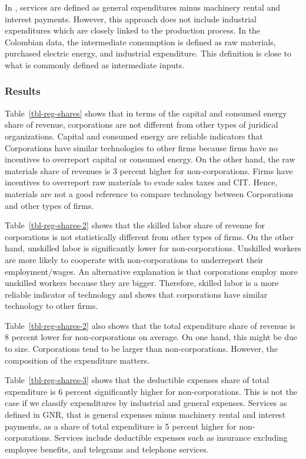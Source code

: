 \documentclass[
  12pt]{article}
\theoremstyle{definition}
\theoremstyle{remark}
\begin{document}
In \citet{Gandhi2020}, services are defined as general expenditures
minus machinery rental and interest payments. However, this approach
does not include industrial expenditures which are closely linked to the
production process. In the Colombian data, the intermediate consumption
is defined as raw materials, purchased electric energy, and industrial
expenditure. This definition is close to what is commonly defined as
intermediate inputs.

\subsubsection{Results}\label{results}

Table~\ref{tbl-reg-shares} shows that in terms of the capital and
consumed energy share of revenue, corporations are not different from
other types of juridical organizations. Capital and consumed energy are
reliable indicators that Corporations have similar technologies to other
firms because firms have no incentives to overreport capital or consumed
energy. On the other hand, the raw materials share of revenues is 3
percent higher for non-corporations. Firms have incentives to overreport
raw materials to evade sales taxes and CIT. Hence, materials are not a
good reference to compare technology between Corporations and other
types of firms.

Table~\ref{tbl-reg-shares-2} shows that the skilled labor share of
revenue for corporations is not statistically different from other types
of firms. On the other hand, unskilled labor is significantly lower for
non-corporations. Unskilled workers are more likely to cooperate with
non-corporations to underreport their employment/wages. An alternative
explanation is that corporations employ more unskilled workers because
they are bigger. Therefore, skilled labor is a more reliable indicator
of technology and shows that corporations have similar technology to
other firms.

Table~\ref{tbl-reg-shares-2} also shows that the total expenditure share
of revenue is 8 percent lower for non-corporations on average. On one
hand, this might be due to size. Corporations tend to be larger than
non-corporations. However, the composition of the expenditure matters.

Table~\ref{tbl-reg-shares-3} shows that the deductible expenses share of
total expenditure is 6 percent significantly higher for
non-corporations. This is not the case if we classify expenditures by
industrial and general expenses. Services as defined in GNR, that is
general expenses minus machinery rental and interest payments, as a
share of total expenditure is 5 percent higher for non-corporations.
Services include deductible expenses such as insurance excluding
employee benefits, and telegrams and telephone services.
\end{document}
